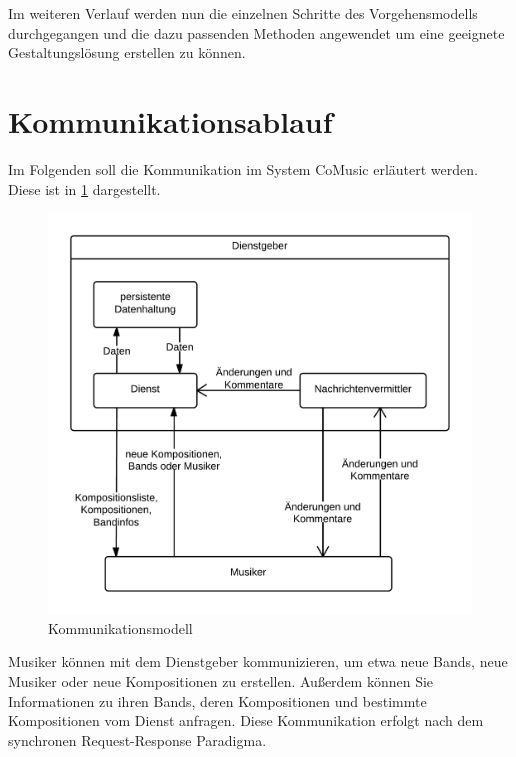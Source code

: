 \documentclass[12pt]{scrartcl}
\begin{document}
Im weiteren Verlauf werden nun die einzelnen Schritte des Vorgehensmodells durchgegangen und die dazu passenden Methoden angewendet um eine geeignete Gestaltungslösung erstellen zu können.


\section{Kommunikationsablauf}



Im Folgenden soll die Kommunikation im System CoMusic erläutert werden. Diese ist in \ref{fig:kommunikationsmodell} dargestellt.

\begin{figure}
\centering
\includegraphics[scale=.25]{figures/kommunikationsmodell}
\caption{Kommunikationsmodell}
\label{fig:kommunikationsmodell}
\end{figure}

Musiker können mit dem Dienstgeber kommunizieren, um etwa neue Bands, neue Musiker oder neue Kompositionen zu erstellen. Außerdem können Sie Informationen zu ihren Bands, deren Kompositionen und bestimmte Kompositionen vom Dienst anfragen. Diese Kommunikation erfolgt nach dem synchronen Request-Response Paradigma.
\end{document}
